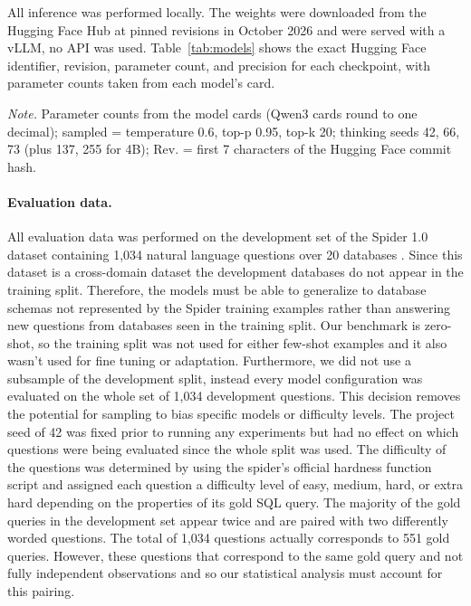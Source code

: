 All inference was performed locally. The weights were downloaded from the Hugging Face Hub at pinned revisions in October 2026 and were served with a vLLM, no API was used. Table~\ref{tab:models} shows the exact Hugging Face identifier, revision, parameter count, and precision for each checkpoint, with parameter counts taken from each model’s card.

\begin{table}[htbp]
\centering
\caption{Model Configurations evaluated in Task 1}
\label{tab:models}
\scriptsize
\setlength{\tabcolsep}{3pt}
\resizebox{\linewidth}{!}{}

\vspace{2pt}
\begin{minipage}{\linewidth}\scriptsize
\textit{Note.} Parameter counts from the model cards (Qwen3 cards round to one decimal); sampled = temperature 0.6, top-p 0.95, top-k 20; thinking seeds 42, 66, 73 (plus 137, 255 for 4B); Rev. = first 7 characters of the Hugging Face commit hash.
\end{minipage}
\end{table}

\paragraph{Evaluation data.}
All evaluation data was performed on the development set of the Spider 1.0 dataset containing 1,034 natural language questions over 20 databases \citep{yu2018spider}. Since this dataset is a cross-domain dataset the development databases do not appear in the training split. Therefore, the models must be able to generalize to database schemas not represented by the Spider training examples rather than answering new questions from databases seen in the training split. Our benchmark is zero-shot, so the training split was not used for either few-shot examples and it also wasn’t used for fine tuning or adaptation. Furthermore, we did not use a subsample of the development split, instead every model configuration was evaluated on the whole set of 1,034 development questions. This decision removes the potential for sampling to bias specific models or difficulty levels. The project seed of 42 was fixed prior to running any experiments but had no effect on which questions were being evaluated since the whole split was used. The difficulty of the questions was determined by using the spider’s official hardness function script and assigned each question a difficulty level of easy, medium, hard, or extra hard depending on the properties of its gold SQL query. The majority of the gold queries in the development set appear twice and are paired with two differently worded questions. The total of 1,034 questions actually corresponds to 551 gold queries. However, these questions that correspond to the same gold query and not fully independent observations and so our statistical analysis must account for this pairing.

